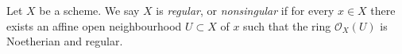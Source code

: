 \begin{definition}
\label{definition-regular}
Let $X$ be a scheme. We say $X$ is {\it regular}, or {\it nonsingular} if
for every $x \in X$ there exists an affine open neighbourhood
$U \subset X$ of $x$ such that the ring $\mathcal{O}_X(U)$ is
Noetherian and regular.
\end{definition}